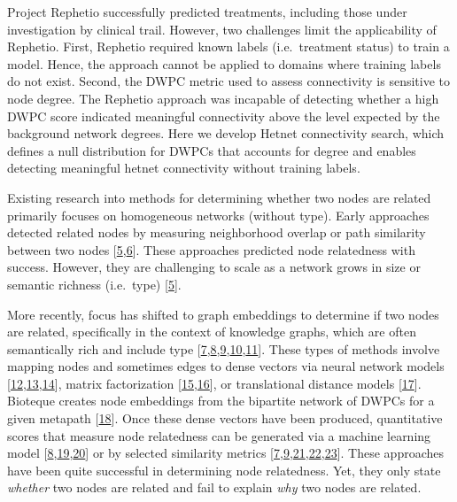 Project Rephetio successfully predicted treatments,
including those under investigation by clinical trail.
However, two challenges limit the applicability of Rephetio.
First, Rephetio required known labels (i.e.~treatment status) to train a model.
Hence, the approach cannot be applied to domains where training labels do not exist.
Second, the DWPC metric used to assess connectivity is sensitive to node degree.
The Rephetio approach was incapable of detecting whether a high DWPC score indicated meaningful connectivity above the level expected by the background network degrees.
Here we develop Hetnet connectivity search, which defines a null distribution for DWPCs that accounts for degree and enables detecting meaningful hetnet connectivity without training labels.

Existing research into methods for determining whether two nodes are related primarily focuses on homogeneous networks (without type).
Early approaches detected related nodes by measuring neighborhood overlap or path similarity between two nodes {[}\protect\hyperlink{ref-EfWvuSjX}{5},\protect\hyperlink{ref-7iZtCGcX}{6}{]}.
These approaches predicted node relatedness with success.
However, they are challenging to scale as a network grows in size or semantic richness (i.e.~type) {[}\protect\hyperlink{ref-EfWvuSjX}{5}{]}.

More recently, focus has shifted to graph embeddings to determine if two nodes are related,
specifically in the context of knowledge graphs, which are often semantically rich and include type
{[}\protect\hyperlink{ref-otY29wFV}{7},\protect\hyperlink{ref-NnOS86ev}{8},\protect\hyperlink{ref-GYLacVTV}{9},\protect\hyperlink{ref-3gzmoW2V}{10},\protect\hyperlink{ref-zHcAMCig}{11}{]}.
These types of methods involve mapping nodes and sometimes edges to dense vectors via
neural network models {[}\protect\hyperlink{ref-U1Dfux5r}{12},\protect\hyperlink{ref-1AeZs6xaT}{13},\protect\hyperlink{ref-jyhFBVzQ}{14}{]},
matrix factorization {[}\protect\hyperlink{ref-xq3Nsf5M}{15},\protect\hyperlink{ref-1EeE9qtFA}{16}{]},
or translational distance models {[}\protect\hyperlink{ref-cnCLKeU9}{17}{]}.
Bioteque creates node embeddings from the bipartite network of DWPCs for a given metapath {[}\protect\hyperlink{ref-vhsYX2y}{18}{]}.
Once these dense vectors have been produced, quantitative scores that measure node relatedness can be generated via a machine learning model {[}\protect\hyperlink{ref-NnOS86ev}{8},\protect\hyperlink{ref-taI1UUAE}{19},\protect\hyperlink{ref-17ioZ6znu}{20}{]} or by selected similarity metrics {[}\protect\hyperlink{ref-otY29wFV}{7},\protect\hyperlink{ref-GYLacVTV}{9},\protect\hyperlink{ref-1D9FTzRBg}{21},\protect\hyperlink{ref-6PISrkV5}{22},\protect\hyperlink{ref-19E33rJiu}{23}{]}.
These approaches have been quite successful in determining node relatedness.
Yet, they only state \emph{whether} two nodes are related and fail to explain \emph{why} two nodes are related.

